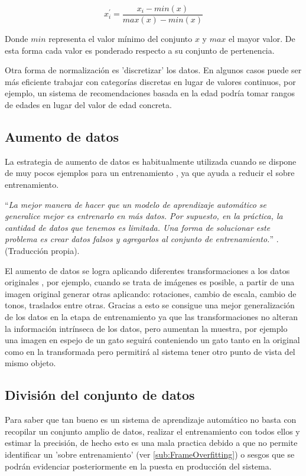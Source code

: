         \begin{equation}
            \label{EQ:MinMaxNormalization}
            x_i^{'} = \frac{x_i - min(x)}{max(x) - min(x)}
        \end{equation}
        
        Donde $min$ representa el valor mínimo del conjunto $x$ y $max$ el mayor valor. De esta forma cada valor es ponderado respecto a su conjunto de pertenencia.
        
        Otra forma de normalización es 'discretizar' los datos. En algunos casos puede ser más eficiente trabajar con categorías discretas en lugar de valores continuos, por ejemplo, un sistema de recomendaciones basada en la edad podría tomar rangos de edades en lugar del valor de edad concreta.
        
    \subsection{Aumento de datos}
    \label{sub:FrameDataAugmented}
        
        La estrategia de aumento de datos es habitualmente utilizada cuando se dispone de muy pocos ejemplos para un entrenamiento \cite{Rojas2019heart}, ya que ayuda a reducir el sobre entrenamiento.
        
        ``\textit{La mejor manera de hacer que un modelo de aprendizaje automático se generalice mejor es entrenarlo en más datos. Por supuesto, en la práctica, la cantidad de datos que tenemos es limitada. Una forma de solucionar este problema es crear datos falsos y agregarlos al conjunto de entrenamiento.}'' \cite[Pag. 236]{Goodfellow2016}. (Traducción propia).
        
        El aumento de datos se logra aplicando diferentes transformaciones a los datos originales \cite{Fawzi2016DataAugmented}, por ejemplo, cuando se trata de imágenes es posible, a partir de una imagen original generar otras aplicando: rotaciones, cambio de escala, cambio de tonos, traslados entre otras. Gracias a esto se consigue una mejor generalización de los datos en la etapa de entrenamiento ya que las transformaciones no alteran la información intrínseca de los datos, pero aumentan la muestra, por ejemplo una imagen en espejo de un gato seguirá conteniendo un gato tanto en la original como en la transformada pero permitirá al sistema tener otro punto de vista del mismo objeto.
        
    \subsection{División del conjunto de datos}
    \label{sub:FrameDatasetSplitting}
        Para saber que tan bueno es un sistema de aprendizaje automático no basta con recopilar un conjunto amplio de datos, realizar el entrenamiento con todos ellos y estimar la precisión, de hecho esto es una mala practica debido a que no permite identificar un 'sobre entrenamiento' (ver \ref{sub:FrameOverfitting}) o sesgos que se podrán evidenciar posteriormente en la puesta en producción del sistema.
        
